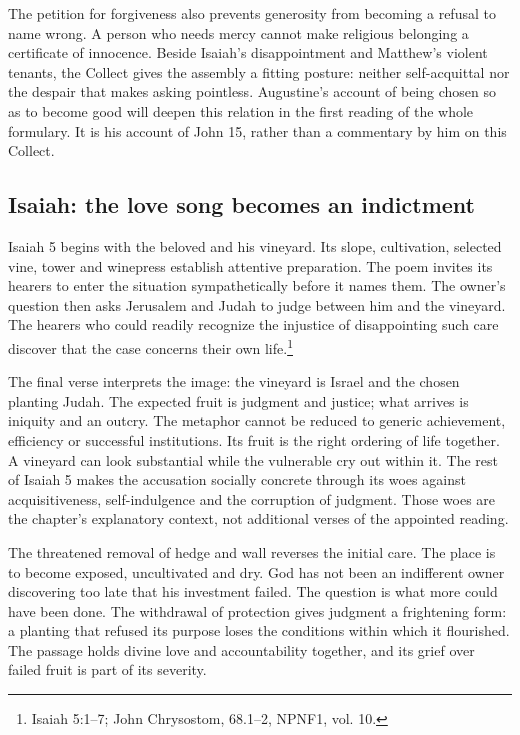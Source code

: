 The petition for forgiveness also prevents generosity from becoming a refusal to name wrong. A person who needs mercy cannot make religious belonging a certificate of innocence. Beside Isaiah's disappointment and Matthew's violent tenants, the Collect gives the assembly a fitting posture: neither self-acquittal nor the despair that makes asking pointless. Augustine's account of being chosen so as to become good will deepen this relation in the first reading of the whole formulary. It is his account of John 15, rather than a commentary by him on this Collect.

\subsection{Isaiah: the love song becomes an indictment}
Isaiah 5 begins with the beloved and his vineyard. Its slope, cultivation, selected vine, tower and winepress establish attentive preparation. The poem invites its hearers to enter the situation sympathetically before it names them. The owner's question then asks Jerusalem and Judah to judge between him and the vineyard. The hearers who could readily recognize the injustice of disappointing such care discover that the case concerns their own life.\footnote{Isaiah 5:1--7; John Chrysostom,  68.1--2, NPNF1, vol. 10.}

The final verse interprets the image: the vineyard is Israel and the chosen planting Judah. The expected fruit is judgment and justice; what arrives is iniquity and an outcry. The metaphor cannot be reduced to generic achievement, efficiency or successful institutions. Its fruit is the right ordering of life together. A vineyard can look substantial while the vulnerable cry out within it. The rest of Isaiah 5 makes the accusation socially concrete through its woes against acquisitiveness, self-indulgence and the corruption of judgment. Those woes are the chapter's explanatory context, not additional verses of the appointed reading.

The threatened removal of hedge and wall reverses the initial care. The place is to become exposed, uncultivated and dry. God has not been an indifferent owner discovering too late that his investment failed. The question is what more could have been done. The withdrawal of protection gives judgment a frightening form: a planting that refused its purpose loses the conditions within which it flourished. The passage holds divine love and accountability together, and its grief over failed fruit is part of its severity.

